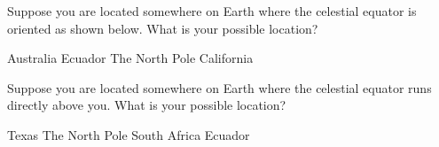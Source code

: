 \documentclass[addpoints]{exam}
\begin{document}
\begin{questions}
\question
Suppose you are located somewhere on Earth where the celestial equator is oriented as shown below. What is your possible location?

\begin{minipage}{0.33\textwidth}
\begin{choices}
\choice Australia
\choice Ecuador
\choice The North Pole
\correctchoice California
\end{choices}
\end{minipage}%
\begin{minipage}{0.50\textwidth}
    \centering
{}
\end{minipage}%

\question
Suppose you are located somewhere on Earth where the celestial equator runs directly above you. What is your possible location?

\begin{minipage}{0.33\textwidth}
\begin{choices}
\choice Texas
\choice The North Pole
\choice South Africa
\correctchoice Ecuador 
\end{choices}
\end{minipage}%
\begin{minipage}{0.50\textwidth}
    \centering
{}
\end{minipage}
\end{questions}
\end{document}
